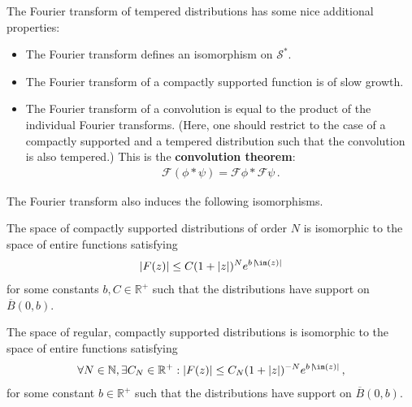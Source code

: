     \begin{property}
        The Fourier transform of tempered distributions has some nice additional properties:
        \begin{itemize}
            \item The Fourier transform defines an isomorphism on $\mathscr{S}^*$.
            \item The Fourier transform of a compactly supported function is of slow growth.
            \item The Fourier transform of a convolution is equal to the product of the individual Fourier transforms. (Here, one should restrict to the case of a compactly supported and a tempered distribution such that the convolution is also tempered.) This is the \textbf{convolution theorem}:
            \begin{gather}
                \label{distributions:convolution_theorem}
                \mathcal{F}(\phi\ast\psi) = \mathcal{F}\phi\ast\mathcal{F}\psi\,.
            \end{gather}
        \end{itemize}
    \end{property}

    The Fourier transform also induces the following isomorphisms.
    \begin{theorem}\label{distributions:paley_wiener}
        The space of compactly supported distributions of order $N$ is isomorphic to the space of entire functions satisfying
        \begin{gather}
            |F(z)|\leq C(1+|z|)^Ne^{b\,|\!\im(z)|}
        \end{gather}
        for some constants $b,C\in\mathbb{R}^+$ such that the distributions have support on $\overline{B}(0,b)$.

        The space of regular, compactly supported distributions is isomorphic to the space of entire functions satisfying
        \begin{gather}
            \forall N\in\mathbb{N},\exists C_N\in\mathbb{R}^+:|F(z)|\leq C_N(1+|z|)^{-N}e^{b\,|\!\im(z)|}\,,
        \end{gather}
        for some constant $b\in\mathbb{R}^+$ such that the distributions have support on $\overline{B}(0,b)$.
    \end{theorem}

